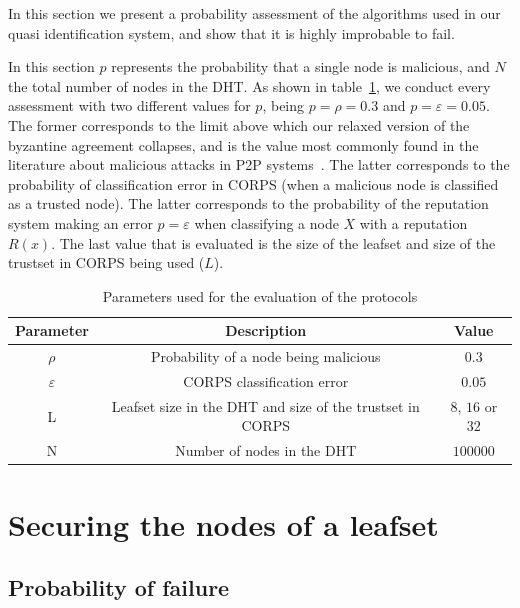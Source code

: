 In this section we present a probability assessment of
the algorithms used in our quasi identification system, and show that it is highly
improbable to fail.

In this section $p$ represents the probability that a single node is
malicious, and $N$ the total number of nodes in the DHT.
As shown in table~\ref{tab:variables_used}, we conduct every
assessment with two different values for $p$, being $p = \rho = 0.3$ and $p = \varepsilon =  0.05$.
The former corresponds to the limit above which our relaxed version of the
byzantine agreement collapses, and is the value most
commonly found in the literature about malicious attacks in P2P
systems~\cite{p2p_certification}. The latter corresponds to the probability of
classification error in CORPS (when a malicious node is classified as a trusted node).
The latter corresponds to the probability of the reputation system making an error $p = \varepsilon$ when classifying a
node $X$ with a reputation $R(x)$. The last  value that is evaluated is the
size of the leafset and size of the trustset in CORPS being used ($L$).


  \begin{table}
    \centering
    \footnotesize
    \begin{tabular}{|ccc|}
      \hline
      \textbf{Parameter} & \textbf{Description} & \textbf{Value} \\
      \hline
      $\rho$ &  Probability of a node being malicious  & $0.3$  \\
      $\varepsilon$& CORPS classification error   & $0.05$ \\
      L &  Leafset size in the DHT and size of the trustset in CORPS  & $8$, $16$ or $32$  \\
      N &  Number of nodes in the DHT & $100000$  \\
      \hline
    \end{tabular}
    \caption{Parameters used for the evaluation of the protocols}
    \label{tab:variables_used}
  \end{table}




\section{Securing the nodes of a leafset}
\label{sec:eval_leafset}
  
  \subsection{Probability of failure}
  

